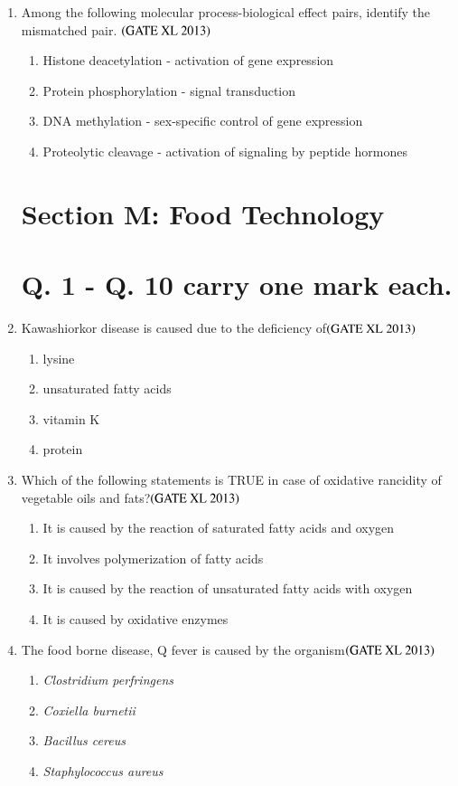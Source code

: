 \documentclass[journal]{IEEEtran}
\begin{document}
\begin{enumerate}
\item Among the following molecular process-biological effect pairs, identify the mismatched pair. \hfill $\left(\text{GATE XL 2013}\right)$
\begin{enumerate}
    \item Histone deacetylation - activation of gene expression
    \item Protein phosphorylation - signal transduction
    \item DNA methylation - sex-specific control of gene expression
    \item Proteolytic cleavage - activation of signaling by peptide hormones
\end{enumerate}

\clearpage
\section*{Section M: Food Technology}

\section*{Q. 1 - Q. 10 carry one mark each.}

\item Kawashiorkor disease is caused due to the deficiency of\hfill $\left(\text{GATE XL 2013}\right)$
\begin{enumerate}
    \item lysine
    \item unsaturated fatty acids
    \item vitamin K
    \item protein
\end{enumerate}

\item Which of the following statements is TRUE in case of oxidative rancidity of vegetable oils and fats?\hfill $\left(\text{GATE XL 2013}\right)$
\begin{enumerate}
    \item It is caused by the reaction of saturated fatty acids and oxygen
    \item It involves polymerization of fatty acids
    \item It is caused by the reaction of unsaturated fatty acids with oxygen
    \item It is caused by oxidative enzymes
\end{enumerate}

\item The food borne disease, Q fever is caused by the organism\hfill $\left(\text{GATE XL 2013}\right)$
\begin{enumerate}
    \item \textit{Clostridium perfringens}
    \item \textit{Coxiella burnetii}
    \item \textit{Bacillus cereus}
    \item \textit{Staphylococcus aureus}
\end{enumerate}


\end{enumerate}
\end{document}
